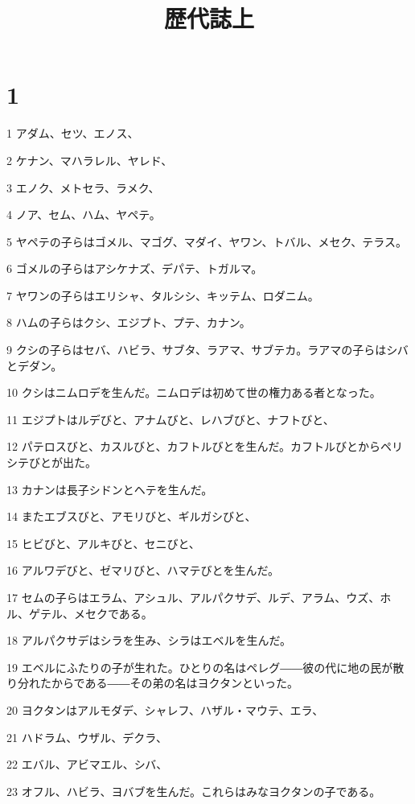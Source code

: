 

\title{歴代誌上}


\chapter{1}

\par 1 アダム、セツ、エノス、
\par 2 ケナン、マハラレル、ヤレド、
\par 3 エノク、メトセラ、ラメク、
\par 4 ノア、セム、ハム、ヤペテ。
\par 5 ヤペテの子らはゴメル、マゴグ、マダイ、ヤワン、トバル、メセク、テラス。
\par 6 ゴメルの子らはアシケナズ、デパテ、トガルマ。
\par 7 ヤワンの子らはエリシャ、タルシシ、キッテム、ロダニム。
\par 8 ハムの子らはクシ、エジプト、プテ、カナン。
\par 9 クシの子らはセバ、ハビラ、サブタ、ラアマ、サブテカ。ラアマの子らはシバとデダン。
\par 10 クシはニムロデを生んだ。ニムロデは初めて世の権力ある者となった。
\par 11 エジプトはルデびと、アナムびと、レハブびと、ナフトびと、
\par 12 パテロスびと、カスルびと、カフトルびとを生んだ。カフトルびとからペリシテびとが出た。
\par 13 カナンは長子シドンとヘテを生んだ。
\par 14 またエブスびと、アモリびと、ギルガシびと、
\par 15 ヒビびと、アルキびと、セニびと、
\par 16 アルワデびと、ゼマリびと、ハマテびとを生んだ。
\par 17 セムの子らはエラム、アシュル、アルパクサデ、ルデ、アラム、ウズ、ホル、ゲテル、メセクである。
\par 18 アルパクサデはシラを生み、シラはエベルを生んだ。
\par 19 エベルにふたりの子が生れた。ひとりの名はペレグ――彼の代に地の民が散り分れたからである――その弟の名はヨクタンといった。
\par 20 ヨクタンはアルモダデ、シャレフ、ハザル・マウテ、エラ、
\par 21 ハドラム、ウザル、デクラ、
\par 22 エバル、アビマエル、シバ、
\par 23 オフル、ハビラ、ヨバブを生んだ。これらはみなヨクタンの子である。
